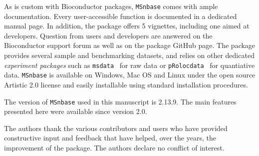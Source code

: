 \documentclass[journal=jacsat,manuscript=article]{achemso}\usepackage[]{graphicx}\usepackage[]{color}
\begin{document}
As is custom with Bioconductor packages, \texttt{MSnbase} comes with
ample documentation. Every user-accessible function is documented in a
dedicated manual page. In addition, the package offers 5 vignettes,
including one aimed at developers. Question from users and developers
are answered on the Bioconductor support forum as well as on the
package GitHub page. The package provides several sample and
benchmarking datasets, and relies on other dedicated
\textit{experiment packages} such as \texttt{msdata}~\cite{msdata} for
raw data or \texttt{pRolocdata}~\cite{Gatto:2014a} for quantiative
data. \texttt{MSnbase} is available on Windows, Mac OS and Linux under
the open source Artistic 2.0 license and easily installable using
standard installation procedures.




The version of \texttt{MSnbase} used in this manuscript is
2.13.9. The main features presented here were available since
version 2.0.



\begin{acknowledgement}

The authors thank the various contributors and users who have provided
constructive input and feedback that have helped, over the years, the
improvement of the package. The authors declare no conflict of
interest.

\end{acknowledgement}




\end{document}
